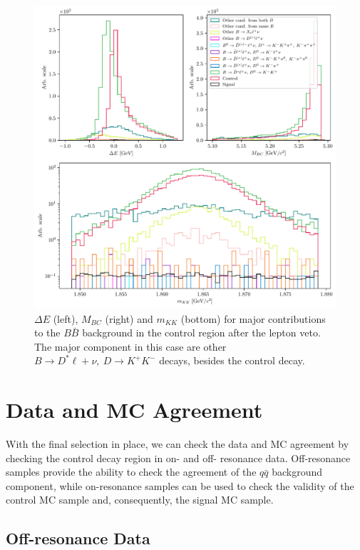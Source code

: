 \begin{figure}[H]
	\centering
	\captionsetup{width=0.8\linewidth}
	\includegraphics[width=\linewidth]{fig/cs_BKG_composition_after}
	\caption{$\Delta E$ (left), $M_{BC}$ (right) and $m_{KK}$ (bottom) for major contributions to the $B \bar B$ background in the control region after the lepton veto. The major component in this case are other $B \to D^* \ell+ \nu,~D \to K^+K^-$ decays, besides the control decay.}
	\label{fig:cs_bkg_after}
\end{figure} 

\section{Data and MC Agreement}

With the final selection in place, we can check the data and MC agreement by checking the control decay region in on- and off- resonance data. Off-resonance samples provide the ability to check the agreement of the $q\bar q$ background component, while on-resonance samples can be used to check the validity of the control MC sample and, consequently, the signal MC sample.

\subsection{Off-resonance Data}

